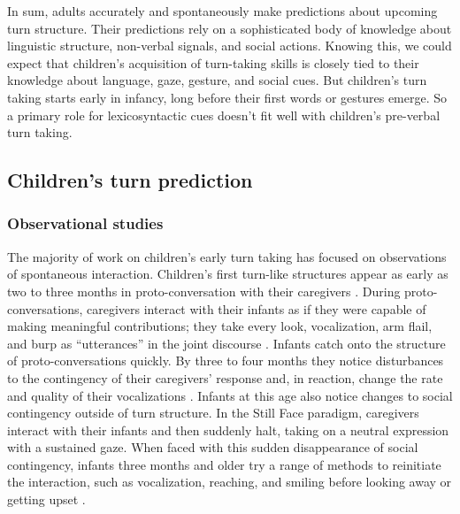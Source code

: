 \documentclass[authoryear, 12pt]{elsarticle}
\begin{document}
In sum, adults accurately and spontaneously make predictions about upcoming turn structure. Their predictions rely on a sophisticated body of knowledge about linguistic structure, non-verbal signals, and social actions. Knowing this, we could expect that children's acquisition of turn-taking skills is closely tied to their knowledge about language, gaze, gesture, and social cues. But children's turn taking starts early in infancy, long before their first words or gestures emerge. So a primary role for lexicosyntactic cues doesn't fit well with children's pre-verbal turn taking.

\subsection{Children's turn prediction}

\subsubsection{Observational studies}

The majority of work on children's early turn taking has focused on observations of spontaneous interaction. Children's first turn-like structures appear as early as two to three months in proto-conversation with their caregivers \citep{bruner1975, bruner1985}. During proto-conversations, caregivers interact with their infants as if they were capable of making meaningful contributions; they take every look, vocalization, arm flail, and burp as ``utterances'' in the joint discourse \citep{bateson1975, jaffe2001, snow1977}. Infants catch onto the structure of proto-conversations quickly. By three to four months they notice disturbances to the contingency of their caregivers' response and, in reaction, change the rate and quality of their vocalizations \citep{k-bloom1988, masataka1993}. Infants at this age also notice changes to social contingency outside of turn structure. In the Still Face paradigm, caregivers interact with their infants and then suddenly halt, taking on a neutral expression with a sustained gaze. When faced with this sudden disappearance of social contingency, infants three months and older try a range of methods to reinitiate the interaction, such as vocalization, reaching, and smiling before looking away or getting upset \citep{rochat1998, toda1993}.
\end{document}
